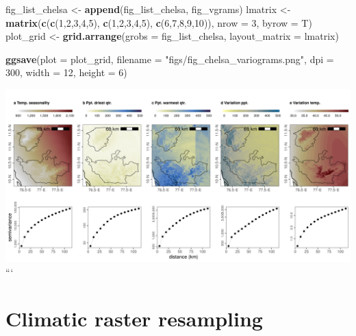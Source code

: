 \documentclass[]{article}
\newenvironment{Shaded}{}{}
\newcommand{\DataTypeTok}[1]{\textcolor[rgb]{0.56,0.13,0.00}{#1}}
\newcommand{\DecValTok}[1]{\textcolor[rgb]{0.25,0.63,0.44}{#1}}
\newcommand{\KeywordTok}[1]{\textcolor[rgb]{0.00,0.44,0.13}{\textbf{#1}}}
\newcommand{\NormalTok}[1]{#1}
\newcommand{\StringTok}[1]{\textcolor[rgb]{0.25,0.44,0.63}{#1}}
\begin{document}
\begin{Shaded}
\begin{Highlighting}[]
\NormalTok{fig_list_chelsa <-}\StringTok{ }\KeywordTok{append}\NormalTok{(fig_list_chelsa, fig_vgrams)}
\NormalTok{lmatrix <-}\StringTok{ }\KeywordTok{matrix}\NormalTok{(}\KeywordTok{c}\NormalTok{(}\KeywordTok{c}\NormalTok{(}\DecValTok{1}\NormalTok{,}\DecValTok{2}\NormalTok{,}\DecValTok{3}\NormalTok{,}\DecValTok{4}\NormalTok{,}\DecValTok{5}\NormalTok{), }\KeywordTok{c}\NormalTok{(}\DecValTok{1}\NormalTok{,}\DecValTok{2}\NormalTok{,}\DecValTok{3}\NormalTok{,}\DecValTok{4}\NormalTok{,}\DecValTok{5}\NormalTok{), }\KeywordTok{c}\NormalTok{(}\DecValTok{6}\NormalTok{,}\DecValTok{7}\NormalTok{,}\DecValTok{8}\NormalTok{,}\DecValTok{9}\NormalTok{,}\DecValTok{10}\NormalTok{)), }\DataTypeTok{nrow =} \DecValTok{3}\NormalTok{, }\DataTypeTok{byrow =}\NormalTok{ T)}
\NormalTok{plot_grid <-}\StringTok{ }\KeywordTok{grid.arrange}\NormalTok{(}\DataTypeTok{grobs =}\NormalTok{ fig_list_chelsa, }\DataTypeTok{layout_matrix =}\NormalTok{ lmatrix)}

\KeywordTok{ggsave}\NormalTok{(}\DataTypeTok{plot =}\NormalTok{ plot_grid, }\DataTypeTok{filename =} \StringTok{"figs/fig_chelsa_variograms.png"}\NormalTok{, }\DataTypeTok{dpi =} \DecValTok{300}\NormalTok{, }\DataTypeTok{width =} \DecValTok{12}\NormalTok{, }\DataTypeTok{height =} \DecValTok{6}\NormalTok{)}
\end{Highlighting}
\end{Shaded}

\includegraphics{figs/fig_chelsa_variograms.png}
```

\hypertarget{climatic-raster-resampling}{%
\section{Climatic raster resampling}\label{climatic-raster-resampling}}
\end{document}
